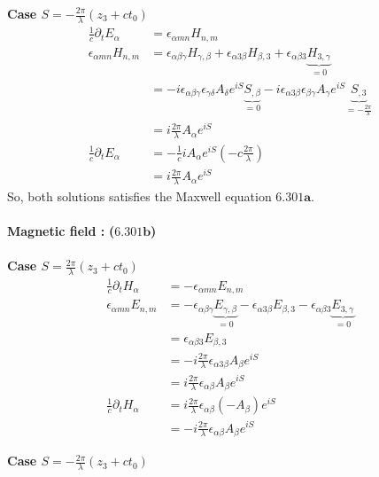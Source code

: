 \textbf{Case $S= -\frac{2\pi}{\lambda}\left(z_3+ct_0\right)$}
\begin{align}
\frac{1}{c}\partial_t E_{\alpha}&=\epsilon_{\alpha mn}H_{n,m}\\
\epsilon_{\alpha mn}H_{n,m}&= \epsilon_{\alpha\beta\gamma}H_{\gamma,\beta}+\epsilon_{\alpha 3\beta}H_{\beta,3}+\epsilon_{\alpha\beta 3}\underbrace{H_{3,\gamma}}_{=0}\\
&= -i\epsilon_{\alpha\beta\gamma}\epsilon_{\gamma\delta}A_{\delta}e^{iS}\underbrace{S_{,\beta}}_{=0}-i\epsilon_{\alpha 3 \beta}\epsilon_{\beta \gamma}A_{\gamma}e^{iS}\underbrace{S_{,3}}_{=-\frac{2\pi}{\lambda}}\\
&= i\frac{2\pi}{\lambda}A_{\alpha}e^{iS}\\
\frac{1}{c}\partial_t E_{\alpha}&=-\frac{1}{c}iA_{\alpha}e^{iS}\left(-c\frac{2\pi}{\lambda}\right)\\
&=i\frac{2\pi}{\lambda}A_{\alpha}e^{iS}
\end{align}
So, both solutions satisfies the Maxwell equation $\mathbf{6.301a}$.\\\\
\textbf{Magnetic field :} \textbf{($\mathbf{6.301b}$)}\\\\
\textbf{Case $S= \frac{2\pi}{\lambda}\left(z_3+ct_0\right)$}
\begin{align}
\frac{1}{c}\partial_t H_{\alpha}&=-\epsilon_{\alpha mn}E_{n,m}\\
\epsilon_{\alpha mn}E_{n,m}&= -\epsilon_{\alpha\beta\gamma}\underbrace{E_{\gamma,\beta}}_{=0}-\epsilon_{\alpha 3\beta}E_{\beta,3}-\epsilon_{\alpha\beta 3}\underbrace{E_{3,\gamma}}_{=0}\\
&=\epsilon_{\alpha \beta3}E_{\beta,3}\\
&= -i\frac{2\pi}{\lambda}\epsilon_{\alpha 3\beta}A_{\beta}e^{iS}\\
&= i\frac{2\pi}{\lambda}\epsilon_{\alpha \beta }A_{\beta}e^{iS}\\
\frac{1}{c}\partial_t H_{\alpha}&= i\frac{2\pi}{\lambda}\epsilon_{\alpha \beta}(-A_{\beta})e^{iS}\\
&= -i\frac{2\pi}{\lambda}\epsilon_{\alpha \beta}A_{\beta}e^{iS}
\end{align}

\textbf{Case $S= -\frac{2\pi}{\lambda}\left(z_3+ct_0\right)$}

